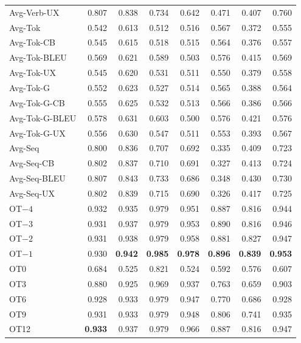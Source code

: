 {\begin{table}[t]
\begin{tabular}{@{}lrrrrrrr@{}}
Avg-Verb-UX & 0.807 & 0.838 & 0.734 & 0.642 & 0.471 & 0.407 & 0.760 \\
\addlinespace
Avg-Tok & 0.542 & 0.613 & 0.512 & 0.516 & 0.567 & 0.372 & 0.555 \\
Avg-Tok-CB & 0.545 & 0.615 & 0.518 & 0.515 & 0.564 & 0.376 & 0.557 \\
Avg-Tok-BLEU & 0.569 & 0.621 & 0.589 & 0.503 & 0.576 & 0.415 & 0.569 \\
Avg-Tok-UX & 0.545 & 0.620 & 0.531 & 0.511 & 0.550 & 0.379 & 0.558 \\
Avg-Tok-G & 0.552 & 0.623 & 0.527 & 0.514 & 0.565 & 0.388 & 0.564 \\
Avg-Tok-G-CB & 0.555 & 0.625 & 0.532 & 0.513 & 0.566 & 0.386 & 0.566 \\
Avg-Tok-G-BLEU & 0.578 & 0.631 & 0.603 & 0.500 & 0.576 & 0.421 & 0.576 \\
Avg-Tok-G-UX & 0.556 & 0.630 & 0.547 & 0.511 & 0.553 & 0.393 & 0.567 \\
\addlinespace
Avg-Seq & 0.800 & 0.836 & 0.707 & 0.692 & 0.335 & 0.409 & 0.723 \\
Avg-Seq-CB & 0.802 & 0.837 & 0.710 & 0.691 & 0.327 & 0.413 & 0.724 \\
Avg-Seq-BLEU & 0.807 & 0.843 & 0.733 & 0.686 & 0.348 & 0.430 & 0.730 \\
Avg-Seq-UX & 0.802 & 0.839 & 0.715 & 0.690 & 0.326 & 0.417 & 0.725 \\
\addlinespace
OT$-4$ & 0.932 & 0.935 & 0.979 & 0.951 & 0.887 & 0.816 & 0.944 \\
OT$-3$ & 0.931 & 0.937 & 0.979 & 0.953 & 0.890 & 0.816 & 0.946 \\
OT$-2$ & 0.931 & 0.938 & 0.979 & 0.958 & 0.881 & 0.827 & 0.947 \\
OT$-1$ & 0.930 & \textbf{0.942} & \textbf{0.985} & \textbf{0.978} & \textbf{0.896} & \textbf{0.839} & \textbf{0.953} \\
OT0 & 0.684 & 0.525 & 0.821 & 0.524 & 0.592 & 0.576 & 0.607 \\
OT3 & 0.880 & 0.925 & 0.969 & 0.937 & 0.763 & 0.659 & 0.903 \\
OT6 & 0.928 & 0.933 & 0.979 & 0.947 & 0.770 & 0.686 & 0.928 \\
OT9 & 0.931 & 0.933 & 0.979 & 0.948 & 0.806 & 0.741 & 0.935 \\
OT12 & \textbf{0.933} & 0.937 & 0.979 & 0.966 & 0.887 & 0.816 & 0.947 \\
\bottomrule
\end{tabular}
\end{table}
}
